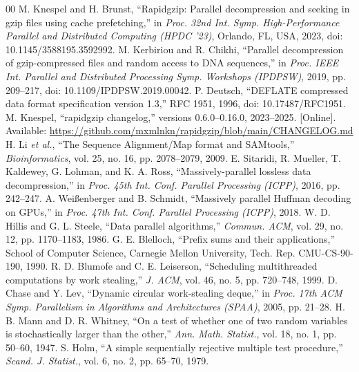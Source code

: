 \documentclass[conference]{IEEEtran}
\begin{document}
\begin{thebibliography}{00}
 M. Knespel and H. Brunst, ``Rapidgzip: Parallel decompression and seeking in gzip files using cache prefetching,'' in \emph{Proc. 32nd Int. Symp. High-Performance Parallel and Distributed Computing (HPDC '23)}, Orlando, FL, USA, 2023, doi: 10.1145/3588195.3592992.
 M. Kerbiriou and R. Chikhi, ``Parallel decompression of gzip-compressed files and random access to DNA sequences,'' in \emph{Proc. IEEE Int. Parallel and Distributed Processing Symp. Workshops (IPDPSW)}, 2019, pp. 209--217, doi: 10.1109/IPDPSW.2019.00042.
 P. Deutsch, ``DEFLATE compressed data format specification version 1.3,'' RFC 1951, 1996, doi: 10.17487/RFC1951.
 M. Knespel, ``rapidgzip changelog,'' versions 0.6.0--0.16.0, 2023--2025. [Online]. Available: \url{https://github.com/mxmlnkn/rapidgzip/blob/main/CHANGELOG.md}
 H. Li \emph{et al.}, ``The Sequence Alignment/Map format and SAMtools,'' \emph{Bioinformatics}, vol. 25, no. 16, pp. 2078--2079, 2009.
 E. Sitaridi, R. Mueller, T. Kaldewey, G. Lohman, and K. A. Ross, ``Massively-parallel lossless data decompression,'' in \emph{Proc. 45th Int. Conf. Parallel Processing (ICPP)}, 2016, pp. 242--247.
 A. Weißenberger and B. Schmidt, ``Massively parallel Huffman decoding on GPUs,'' in \emph{Proc. 47th Int. Conf. Parallel Processing (ICPP)}, 2018.
 W. D. Hillis and G. L. Steele, ``Data parallel algorithms,'' \emph{Commun. ACM}, vol. 29, no. 12, pp. 1170--1183, 1986.
 G. E. Blelloch, ``Prefix sums and their applications,'' School of Computer Science, Carnegie Mellon University, Tech. Rep. CMU-CS-90-190, 1990.
 R. D. Blumofe and C. E. Leiserson, ``Scheduling multithreaded computations by work stealing,'' \emph{J. ACM}, vol. 46, no. 5, pp. 720--748, 1999.
 D. Chase and Y. Lev, ``Dynamic circular work-stealing deque,'' in \emph{Proc. 17th ACM Symp. Parallelism in Algorithms and Architectures (SPAA)}, 2005, pp. 21--28.
 H. B. Mann and D. R. Whitney, ``On a test of whether one of two random variables is stochastically larger than the other,'' \emph{Ann. Math. Statist.}, vol. 18, no. 1, pp. 50--60, 1947.
 S. Holm, ``A simple sequentially rejective multiple test procedure,'' \emph{Scand. J. Statist.}, vol. 6, no. 2, pp. 65--70, 1979.
\end{thebibliography}
\end{document}
